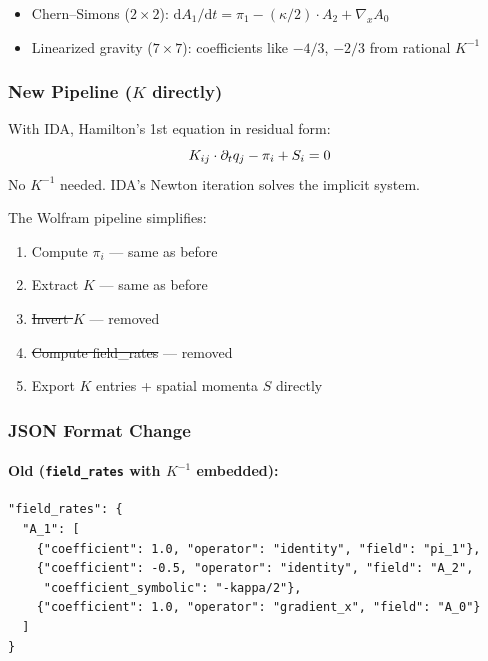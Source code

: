 \begin{itemize}
  \item Chern--Simons ($2\times 2$): $\mathrm{d}A_1/\mathrm{d}t = \pi_1 - (\kappa/2)\cdot A_2 + \nabla_x A_0$
  \item Linearized gravity ($7\times 7$): coefficients like $-4/3$, $-2/3$ from rational $K^{-1}$
\end{itemize}

\subsubsection{New Pipeline ($K$ directly)}
\label{sec:new-pipeline}

With IDA, Hamilton's 1st equation in residual form:
\begin{equation}
  K_{ij} \cdot \partial_t q_j - \pi_i + S_i = 0
  \label{eq:hamilton-first-residual}
\end{equation}
No $K^{-1}$ needed. IDA's Newton iteration solves the implicit system.

The Wolfram pipeline simplifies:

\begin{enumerate}
  \item Compute $\pi_i$ --- same as before
  \item Extract $K$ --- same as before
  \item \sout{Invert $K$} --- removed
  \item \sout{Compute field\_rates} --- removed
  \item Export $K$ entries + spatial momenta $S$ directly
\end{enumerate}

\subsubsection{JSON Format Change}
\label{sec:json-format-change}

\paragraph{Old (\texttt{field\_rates} with $K^{-1}$ embedded):}
\label{par:old-json}

\begin{lstlisting}[style=json]
"field_rates": {
  "A_1": [
    {"coefficient": 1.0, "operator": "identity", "field": "pi_1"},
    {"coefficient": -0.5, "operator": "identity", "field": "A_2",
     "coefficient_symbolic": "-kappa/2"},
    {"coefficient": 1.0, "operator": "gradient_x", "field": "A_0"}
  ]
}
\end{lstlisting}

